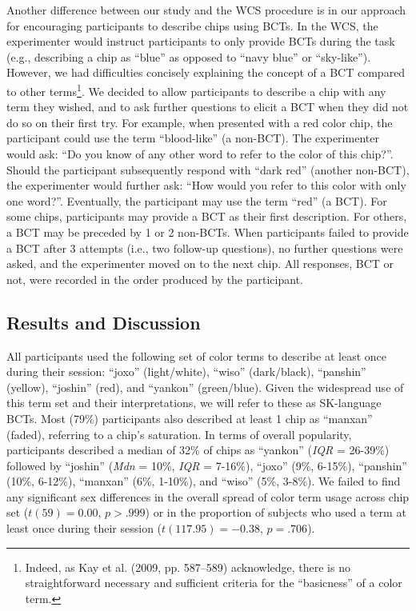 \documentclass[
  english,
  ,man,floatsintext]{apa6}
\begin{document}
Another difference between our study and the WCS procedure is in our approach for encouraging participants to describe chips using BCTs. In the WCS, the experimenter would instruct participants to only provide BCTs during the task (e.g., describing a chip as \enquote{blue} as opposed to \enquote{navy blue} or \enquote{sky-like}). However, we had difficulties concisely explaining the concept of a BCT compared to other terms\footnote{Indeed, as Kay et al. (2009, pp. 587--589) acknowledge, there is no straightforward necessary and sufficient criteria for the \enquote{basicness} of a color term.}. We decided to allow participants to describe a chip with any term they wished, and to ask further questions to elicit a BCT when they did not do so on their first try. For example, when presented with a red color chip, the participant could use the term \enquote{blood-like} (a non-BCT). The experimenter would ask: \enquote{Do you know of any other word to refer to the color of this chip?}. Should the participant subsequently respond with \enquote{dark red} (another non-BCT), the experimenter would further ask: \enquote{How would you refer to this color with only one word?}. Eventually, the participant may use the term \enquote{red} (a BCT). For some chips, participants may provide a BCT as their first description. For others, a BCT may be preceded by 1 or 2 non-BCTs. When participants failed to provide a BCT after 3 attempts (i.e., two follow-up questions), no further questions were asked, and the experimenter moved on to the next chip. All responses, BCT or not, were recorded in the order produced by the participant.

\hypertarget{results-and-discussion}{%
\subsection{Results and Discussion}\label{results-and-discussion}}

All participants used the following set of color terms to describe at least once during their session: \enquote{joxo} (light/white), \enquote{wiso} (dark/black), \enquote{panshin} (yellow), \enquote{joshin} (red), and \enquote{yankon} (green/blue). Given the widespread use of this term set and their interpretations, we will refer to these as SK-language BCTs. Most (79\%) participants also described at least 1 chip as \enquote{manxan} (faded), referring to a chip's saturation. In terms of overall popularity, participants described a median of 32\% of chips as \enquote{yankon} (\emph{IQR} = 26-39\%) followed by \enquote{joshin} (\emph{Mdn} = 10\%, \emph{IQR} = 7-16\%), \enquote{joxo} (9\%, 6-15\%), \enquote{panshin} (10\%, 6-12\%), \enquote{manxan} (6\%, 1-10\%), and \enquote{wiso} (5\%, 3-8\%). We failed to find any significant sex differences in the overall spread of color term usage across chip set (\(t(59) = 0.00\), \(p > .999\)) or in the proportion of subjects who used a term at least once during their session (\(t(117.95) = -0.38\), \(p = .706\)).
\end{document}
